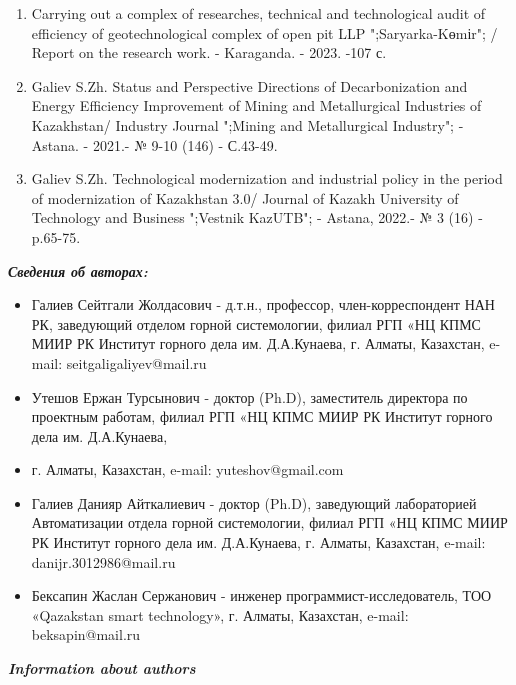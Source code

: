 \begin{enumerate}
\item
Carrying out a complex of researches, technical and technological audit of efficiency of
geotechnological complex of open pit LLP ";Saryarka-Kөmіr"; / Report on the research work. -
Karaganda. - 2023. -107 с.

\item
Galiev S.Zh. Status and Perspective Directions of Decarbonization and Energy Efficiency
Improvement of Mining and Metallurgical Industries of Kazakhstan/ Industry Journal ";Mining
and Metallurgical Industry"; - Astana. - 2021.- № 9-10 (146) - С.43-49.

\item
Galiev S.Zh. Technological modernization and industrial policy in the period of
modernization of Kazakhstan 3.0/ Journal of Kazakh University of Technology and Business
";Vestnik KazUTB"; - Astana, 2022.- № 3 (16) - p.65-75.
\end{enumerate}

\emph{{\bfseries Сведения об авторах:}}

\begin{itemize}
\item
Галиев Сейтгали Жолдасович - д.т.н., профессор, член-корреспондент НАН
РК, заведующий отделом горной системологии, филиал РГП «НЦ КПМС МИИР РК
Институт горного дела им. Д.А.Кунаева, г. Алматы, Казахстан, e-mail:
seitgaligaliyev@mail.ru

\item
Утешов Ержан Турсынович - доктор (Ph.D), заместитель директора по
проектным работам, филиал РГП «НЦ КПМС МИИР РК Институт горного дела им.
Д.А.Кунаева,

\item
г. Алматы, Казахстан, e-mail:
yuteshov@gmail.com

\item
Галиев Данияр Айткалиевич - доктор (Ph.D), заведующий лабораторией
Автоматизации отдела горной системологии, филиал РГП «НЦ КПМС МИИР РК
Институт горного дела им. Д.А.Кунаева, г. Алматы, Казахстан, e-mail:
danijr.3012986@mail.ru

\item
Бексапин Жаслан Сержанович - инженер программист-исследователь, ТОО
«Qazakstan smart technology», г. Алматы, Казахстан, e-mail:
beksapin@mail.ru
\end{itemize}

\emph{{\bfseries Information about authors}}

